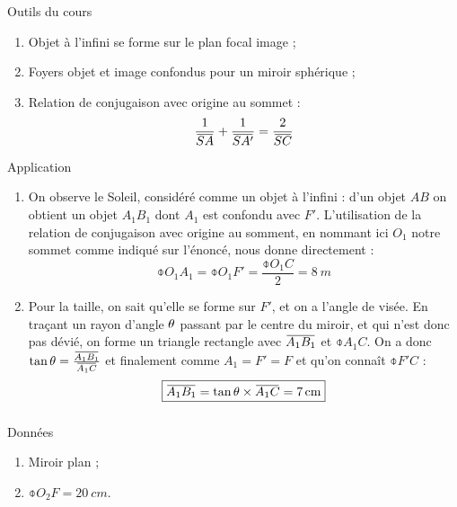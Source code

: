 \documentclass[10pt,a5paper,notitlepage]{book}
\begin{document}
\begin{btcb}{Outils du cours}
    \begin{enumerate}
        \item Objet à l'infini se forme sur le plan focal image ;
        \item Foyers objet et image confondus pour un miroir sphérique ;
        \item Relation de conjugaison avec origine au sommet :
            \[ \frac{1}{\SA} + \frac{1}{\SAp} = \frac{2}{\SC} \]
    \end{enumerate}
\end{btcb}

\begin{lgtcb}{Application}
    \begin{enumerate}
        \item On observe le Soleil, considéré comme un objet à l'infini : d'un
            objet $AB$ on obtient un objet $A_1B_1$ dont $A_1$ est confondu avec
            $F'$.  L'utilisation de la relation de conjugaison avec origine au
            somment, en nommant ici $O_1$ notre sommet comme indiqué sur
            l'énoncé, nous donne directement : \[ \boxed{\obar{O_1A_1} =
            \obar{O_1F'} = \frac{\obar{O_1C}}{2} = \SI{8}{m}} \]

        \item Pour la taille, on sait qu'elle se forme sur $F'$, et on a l'angle
            de visée. En traçant un rayon d'angle $\theta$ passant par le centre du
            miroir, et qui n'est donc pas dévié, on forme un triangle rectangle
            avec $\ABa$ et $\obar{A_1C}$. On a donc $\tan\t =
            \frac{\ABa}{\obar{A_1C}}$ et finalement comme $A_1 = F' = F$ et
            qu'on connaît $\obar{F'C}$ :
            \[ \boxed{\ABa = \tan\t\times\obar{A_1C} = \SI{7}{cm}} \]
    \end{enumerate}
\end{lgtcb}

\subsubsection{}

\begin{vtcb}{Données}
    \begin{enumerate}
        \item Miroir plan ;
        \item $\obar{O_2F} = \SI{20}{cm}$.
    \end{enumerate}
\end{vtcb}
\end{document}
